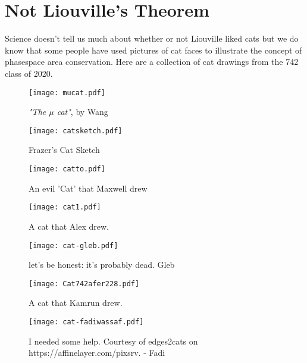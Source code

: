 \section{Not Liouville's Theorem}
Science doesn't tell us much about whether or not Liouville liked cats but we do know that some people have used pictures of cat faces to illustrate the concept of phasespace area conservation. 
Here are a collection of cat drawings from the 742 class of 2020.

\begin{centering}
\begin{figure}\centering
	\texttt{[image: mucat.pdf]}
  \caption{\textsl{"The $\mu$ cat"}, by Wang}
  \label{fig:cat1}
\end{figure}

\begin{figure}
	\texttt{[image: catsketch.pdf]}
  \caption{Frazer's Cat Sketch}
  \label{fig:catsketch}
\end{figure}

\begin{figure}
	\texttt{[image: catto.pdf]}
  \caption{An evil 'Cat' that Maxwell drew}
  \label{fig:catto}
\end{figure}
\end{centering}

\begin{centering}
\begin{figure}
	\texttt{[image: cat1.pdf]}
  \caption{A cat that Alex drew.}
  \label{fig:cat1}
\end{figure}
\end{centering}

\begin{centering}
\begin{figure}
	\texttt{[image: cat-gleb.pdf]}
  \caption{let's be honest: it's probably dead. Gleb }
  \label{fig:cat1}
\end{figure}
\end{centering}

\begin{centering}
\begin{figure}
	\texttt{[image: Cat742afer228.pdf]}
  \caption{A cat that Kamrun drew.}
  \label{Cat draw by Kamrun}
\end{figure}
\end{centering}

\begin{centering}
\begin{figure}\centering
  \texttt{[image: cat-fadiwassaf.pdf]}
  \caption{I needed some help. Courtesy of edges2cats on https://affinelayer.com/pixsrv. - Fadi}
  \label{cat-fadi}
\end{figure}
\end{centering}

\clearpage
